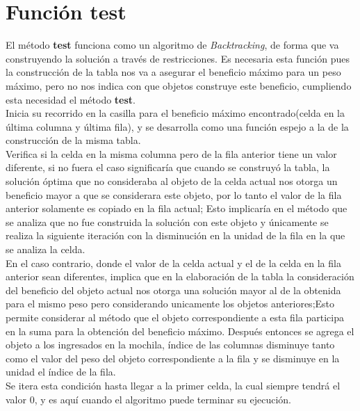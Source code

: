 \newpage

\section*{Función test}
    El método \textbf{test} funciona como un algoritmo de \textit{Backtracking}, de forma que va construyendo la solución a través de restricciones. Es necesaria esta función pues la construcción de la tabla nos va a asegurar el beneficio máximo para un peso máximo, pero no nos indica con que objetos construye este beneficio, cumpliendo esta necesidad el método \textbf{test}.\\
    
    Inicia su recorrido en la casilla para el beneficio máximo encontrado(celda en la última columna y última fila), y se desarrolla como una función espejo a la de la construcción de la misma tabla.\\
    
    Verifica si la celda en la misma columna pero de la fila anterior tiene un valor diferente, si no fuera el caso significaría que cuando se construyó la tabla, la solución óptima que no consideraba al objeto de la celda actual nos otorga un beneficio mayor a que se considerara este objeto, por lo tanto el valor de la fila anterior solamente es copiado en la fila actual; Esto implicaría en el método que se analiza que no fue construida la solución con este objeto y únicamente se realiza la siguiente iteración con la disminución en la unidad de la fila en la que se analiza la celda.\\
    
    En el caso contrario, donde el valor de la celda actual y el de la celda en la fila anterior sean diferentes, implica que en la elaboración de la tabla la consideración del beneficio del objeto actual nos otorga una solución mayor al de la obtenida para el mismo peso pero considerando unicamente los objetos anteriores;Esto permite considerar al método que el objeto correspondiente a esta fila participa en la suma para la obtención del beneficio máximo. Después entonces se agrega el objeto a los ingresados en la mochila, índice de las columnas disminuye tanto como el valor del peso del objeto correspondiente a la fila y se disminuye en la unidad el índice de la fila.\\
    
    Se itera esta condición hasta llegar a la primer celda, la cual siempre tendrá el valor 0, y es aquí cuando el algoritmo puede terminar su ejecución.\\
    
